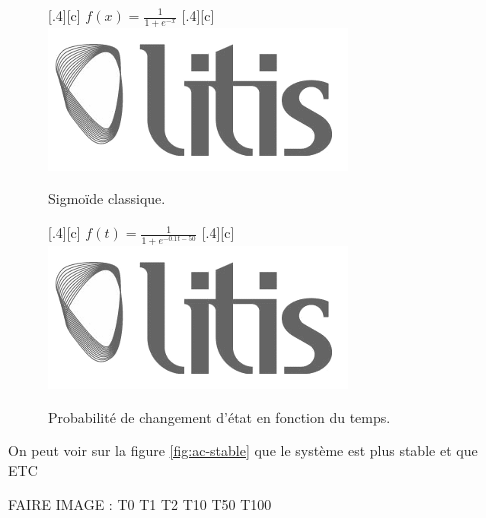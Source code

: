 \documentclass[12pt]{article}
\begin{document}
\begin{figure}[ht]
  \centering
  \subcaptionbox{}[.4\linewidth][c]{
    $f(x) = \frac{1}{1 + e^{-x}}$
  }
  \subcaptionbox{}[.4\linewidth][c]{
    \includegraphics[width=.3\linewidth]{images/logo-litis.png}
  }
  \caption{Sigmoïde classique.}
  \label{fig:sigmoide1}
\end{figure}

\begin{figure}[ht]
  \centering
  \subcaptionbox{}[.4\linewidth][c]{
    $f(t) = \frac{1}{1 + e^{-0.1t-50}}$
  }
  \subcaptionbox{}[.4\linewidth][c]{
    \includegraphics[width=.3\linewidth]{images/logo-litis.png}
  }
  \caption{Probabilité de changement d'état en fonction du temps.}
  \label{fig:sigmoide1}
\end{figure}

On peut voir sur la figure \ref{fig:ac-stable} que le système est plus
stable et que ETC

FAIRE IMAGE : T0 T1 T2 T10 T50 T100
\end{document}
